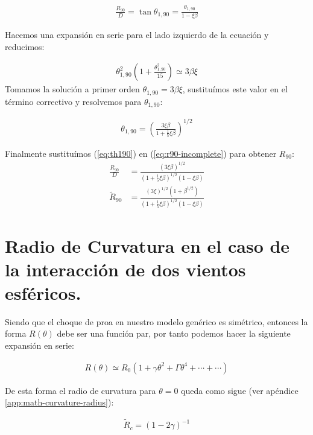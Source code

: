 \begin{align}
  \frac{R_{90}}{D} = \tan\theta_{1,90} = \frac{\theta_{1,90}}{1-\xi\beta} \label{eq:r90-incomplete}
\end{align}

Hacemos una expansión en serie para el lado izquierdo de la ecuación y reducimos:

\begin{align}
  \theta^2_{1,90}\left(1 + \frac{\theta^2_{1,90}}{15}\right) \simeq 3\beta\xi
\end{align}
Tomamos la solución a primer orden $\theta_{1,90} = 3\beta\xi$,  sustituímos este valor en el término correctivo y resolvemos para
$\theta_{1,90}$:

\begin{align}
  \theta_{1,90} = \left(\frac{3\xi\beta}{1+\frac{1}{5}\xi\beta}\right)^{1/2} \label{eq:th190}
\end{align}

Finalmente sustituímos (\ref{eq:th190}) en (\ref{eq:r90-incomplete}) para obtener $R_{90}$:
\begin{align}
  \frac{R_{90}}{D} &= \frac{\left(3\xi\beta\right)^{1/2}}{\left(1+\frac{1}{5}\xi\beta\right)^{1/2}\left(1-\xi\beta\right)} \\
  \tilde{R}_{90} &= \frac{\left(3\xi\right)^{1/2}\left(1+\beta^{1/2}\right)}
                   {\left(1+\frac{1}{5}\xi\beta\right)^{1/2}\left(1-\xi\beta\right)} 
\end{align}

\section{Radio de Curvatura en el  caso de la interacción de dos vientos esféricos.}

Siendo que el choque de proa en nuestro modelo genérico es simétrico, entonces la forma $R(\theta)$ debe ser una función par,
por tanto podemos hacer la siguiente expansión en serie:

\begin{align}
  R(\theta) \simeq R_0\left(1 + \gamma\theta^2 + \Gamma\theta^4 +\cdots +\cdots \right)
\end{align}

De esta forma el radio de curvatura para $\theta=0$ queda como sigue (ver apéndice \ref{app:math-curvature-radius}):

\begin{align}
  \tilde{R}_c = \left(1 - 2\gamma\right)^{-1}
\end{align}

